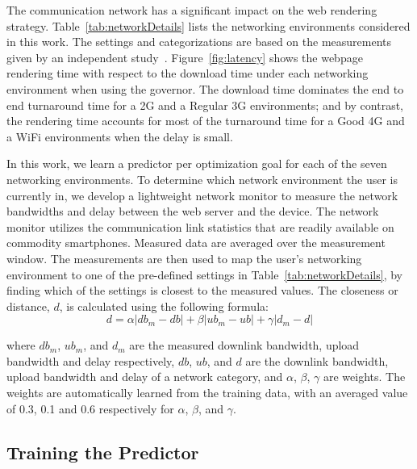 The communication network has a significant impact on the web rendering strategy. 
Table~\ref{tab:networkDetails} lists the networking environments considered in this work. The settings and categorizations are based on the
measurements given by an independent study~\cite{opensignalUK}.  Figure~\ref{fig:latency} shows the webpage rendering time with respect to
the download time under each networking environment when using the \Interactive governor.  The download
time dominates the end to end turnaround time for a 2G and a Regular 3G environments; and by contrast, the rendering time accounts for most
of the turnaround time for a Good 4G and a WiFi environments when the delay is small.


In this work, we learn a predictor per optimization goal for each of the seven networking environments. 
To determine which network environment
the user is currently in, we develop a lightweight network monitor to measure the network bandwidths and delay between the web server and
the device. The network monitor utilizes the communication link statistics that are readily available on commodity smartphones. Measured
data are averaged over the measurement window. The
measurements are then used to map the user's networking environment to one of the pre-defined settings in Table~\ref{tab:networkDetails},
by finding which of the settings is closest to the measured values. The closeness or distance, $d$, is calculated using the following
formula: \vspace{-1mm}
\begin{equation}
d = \alpha |db_{m} - db| + \beta |ub_{m} - ub| + \gamma |d_{m} - d|
\label{eq:cat}
\end{equation}

where $db_m$, $ub_m$, and $d_m$ are the measured downlink bandwidth, upload bandwidth and delay respectively, $db$, $ub$, and $d$ are the
downlink bandwidth, upload bandwidth and delay of a network category, and $\alpha$, $\beta$, $\gamma$ are weights. The weights are
automatically learned from the training data, with an averaged value of 0.3, 0.1 and 0.6 respectively for $\alpha$, $\beta$, and $\gamma$.


\subsection{Training the Predictor}



